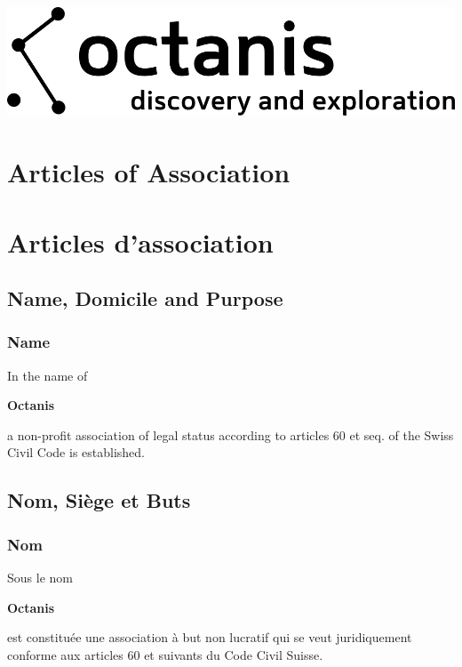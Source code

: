 \documentclass[12pt,a4paper,oneside]{article}
\newcounter{art}
\newcommand{\english}{    \switchcolumn[0]\noindent}
\newcommand{\french}{    \switchcolumn[1]\noindent}
\begin{document}
\begin{center}
	\includegraphics{octanis_org_logo_large}
\end{center}

\begin{paracol}{2}\sloppy



\english
	\section*{Articles of Association}
 	
\french
	\section*{Articles d'association}




\english
	\subsection{Name, Domicile and Purpose}
	\subsubsection{Name}
	In the name of
	\begin{center}
		\textbf{Octanis}
	\end{center}
	a non-profit association of legal status according to articles 60 et  seq.  of  the  Swiss  Civil  Code is established.

\french
	\subsection{Nom, Siège et Buts}
	\subsubsection{Nom}
	Sous le nom 
	\begin{center}
		\textbf{Octanis}
	\end{center}
	est constituée une association à but non lucratif qui se veut juridiquement conforme aux articles 60 et suivants du Code Civil Suisse.



\end{paracol}
\end{document}
